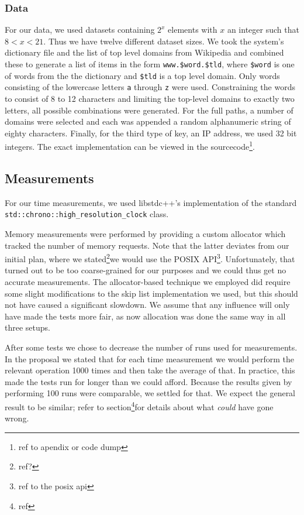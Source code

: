 \documentclass[12pt,a4paper]{article}
\begin{document}
    \subsubsection*{Data}
    For our data, we used datasets containing $2^x$ elements with $x$ an integer such that $8 < x <
    21$. Thus we have twelve different dataset sizes. We took the system's dictionary file and the
    list of top level domains from Wikipedia and combined these to generate a list of items in the
    form \texttt{www.\$word.\$tld}, where \texttt{\$word} is one of words from the the dictionary
    and \texttt{\$tld} is a top level domain.  Only words consisting of the lowercase letters
    \texttt{a} through \texttt{z} were used. Constraining the words to consist of 8 to 12 characters
    and limiting the top-level domains to exactly two letters, all possible combinations were
    generated.  For the full paths, a number of domains were selected and each was appended a random
    alphanumeric string of eighty characters.  Finally, for the third type of key, an IP address, we
    used 32 bit integers. The exact implementation can be viewed in the sourcecode\footnote{ref to
    apendix or code dump}.

    \subsection*{Measurements}
    For our time measurements, we used libstdc++'s implementation of the standard
    \texttt{std::chrono::high\_resolution\_clock} class.

    Memory measurements were performed by providing a custom allocator which tracked the number of
    memory requests.  Note that the latter deviates from our initial plan, where we
    stated\footnote{ref?}we would use the POSIX API\footnote{ref to the posix api}.  Unfortunately,
    that turned out to be too coarse-grained for our purposes and we could thus get no accurate
    measurements.  The allocator-based technique we employed did require some slight modifications
    to the skip list implementation we used, but this should not have caused a significant slowdown.
    We assume that any influence will only have made the tests more fair, as now allocation was done
    the same way in all three setups.

    After some tests we chose to decrease the number of runs used for measurements.  In the proposal
    we stated that for each time measurement we would perform the relevant operation 1000 times and
    then take the average of that.  In practice, this made the tests run for longer than we could
    afford. Because the results given by performing 100 runs were comparable, we settled for that.
    We expect the general result to be similar; refer to section\footnote{ref}for details about what
    \emph{could} have gone wrong.
\end{document}
